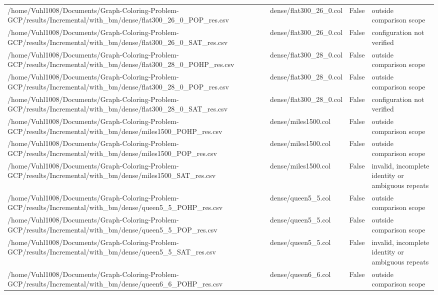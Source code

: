 \begin{table}[htbp]
\begin{tabular}{llll}
/home/Vuhl1008/Documents/Graph-Coloring-Problem-GCP/results/Incremental/with\_bm/dense/flat300\_26\_0\_POP\_res.csv & dense/flat300\_26\_0.col & False & outside comparison scope \\
/home/Vuhl1008/Documents/Graph-Coloring-Problem-GCP/results/Incremental/with\_bm/dense/flat300\_26\_0\_SAT\_res.csv & dense/flat300\_26\_0.col & False & configuration not verified \\
/home/Vuhl1008/Documents/Graph-Coloring-Problem-GCP/results/Incremental/with\_bm/dense/flat300\_28\_0\_POHP\_res.csv & dense/flat300\_28\_0.col & False & outside comparison scope \\
/home/Vuhl1008/Documents/Graph-Coloring-Problem-GCP/results/Incremental/with\_bm/dense/flat300\_28\_0\_POP\_res.csv & dense/flat300\_28\_0.col & False & outside comparison scope \\
/home/Vuhl1008/Documents/Graph-Coloring-Problem-GCP/results/Incremental/with\_bm/dense/flat300\_28\_0\_SAT\_res.csv & dense/flat300\_28\_0.col & False & configuration not verified \\
/home/Vuhl1008/Documents/Graph-Coloring-Problem-GCP/results/Incremental/with\_bm/dense/miles1500\_POHP\_res.csv & dense/miles1500.col & False & outside comparison scope \\
/home/Vuhl1008/Documents/Graph-Coloring-Problem-GCP/results/Incremental/with\_bm/dense/miles1500\_POP\_res.csv & dense/miles1500.col & False & outside comparison scope \\
/home/Vuhl1008/Documents/Graph-Coloring-Problem-GCP/results/Incremental/with\_bm/dense/miles1500\_SAT\_res.csv & dense/miles1500.col & False & invalid, incomplete identity or ambiguous repeats \\
/home/Vuhl1008/Documents/Graph-Coloring-Problem-GCP/results/Incremental/with\_bm/dense/queen5\_5\_POHP\_res.csv & dense/queen5\_5.col & False & outside comparison scope \\
/home/Vuhl1008/Documents/Graph-Coloring-Problem-GCP/results/Incremental/with\_bm/dense/queen5\_5\_POP\_res.csv & dense/queen5\_5.col & False & outside comparison scope \\
/home/Vuhl1008/Documents/Graph-Coloring-Problem-GCP/results/Incremental/with\_bm/dense/queen5\_5\_SAT\_res.csv & dense/queen5\_5.col & False & invalid, incomplete identity or ambiguous repeats \\
/home/Vuhl1008/Documents/Graph-Coloring-Problem-GCP/results/Incremental/with\_bm/dense/queen6\_6\_POHP\_res.csv & dense/queen6\_6.col & False & outside comparison scope \\

\end{tabular}
\end{table}
